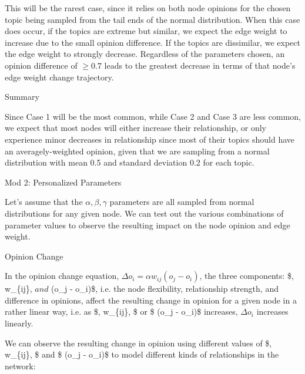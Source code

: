 \documentclass[11pt]{article}
\begin{document}
This will be the rarest case, since it relies on both node opinions for
the chosen topic being sampled from the tail ends of the normal
distribution. When this case does occur, if the topics are extreme but
similar, we expect the edge weight to increase due to the small opinion
difference. If the topics are dissimilar, we expect the edge weight to
strongly decrease. Regardless of the parameters chosen, an opinion
difference of \(\geq 0.7\) leads to the greatest decrease in terms of
that node's edge weight change trajectory.

Summary

Since Case 1 will be the most common, while Case 2 and Case 3 are less
common, we expect that most nodes will either increase their
relationship, or only experience minor decreases in relationship since
most of their topics should have an averagely-weighted opinion, given
that we are sampling from a normal distribution with mean 0.5 and
standard deviation 0.2 for each topic.

    Mod 2: Personalized Parameters

Let's assume that the \(\alpha, \beta,\gamma\) parameters are all
sampled from normal distributions for any given node. We can test out
the various combinations of parameter values to observe the resulting
impact on the node opinion and edge weight.

Opinion Change

In the opinion change equation,
\(\Delta o_i = \alpha w_{ij}(o_j - o_i)\), the three components:
\$\alpha, w\_\{ij\}, \(and\) (o\_j - o\_i)\$, i.e. the node flexibility,
relationship strength, and difference in opinions, affect the resulting
change in opinion for a given node in a rather linear way, i.e. as
\$\alpha, w\_\{ij\}, \$ or \$ (o\_j - o\_i)\$ increases, \(\Delta o_i\)
increases linearly.

We can observe the resulting change in opinion using different values of
\$\alpha, w\_\{ij\}, \$ and \$ (o\_j - o\_i)\$ to model different kinds
of relationships in the network:
\end{document}
